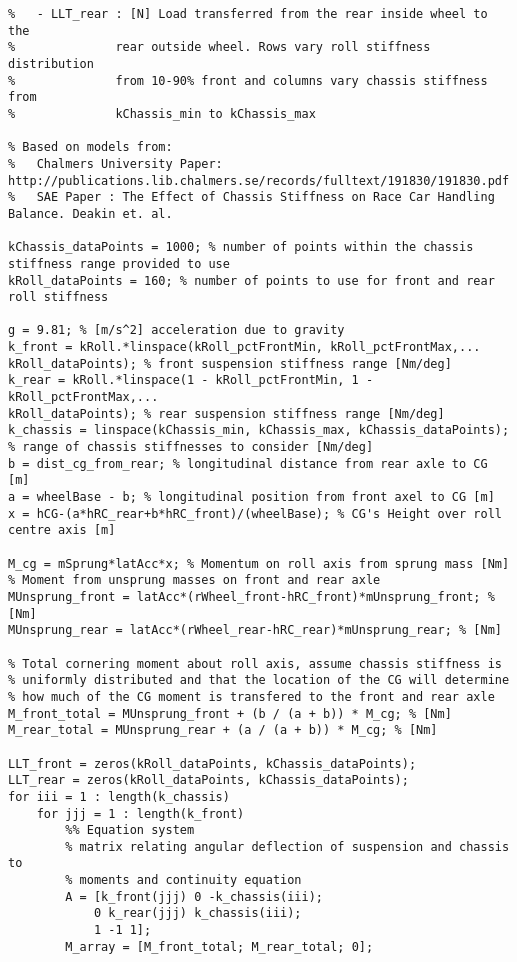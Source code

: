 \begin{lstlisting}
%   - LLT_rear : [N] Load transferred from the rear inside wheel to the 
%              rear outside wheel. Rows vary roll stiffness distribution 
%              from 10-90% front and columns vary chassis stiffness from 
%              kChassis_min to kChassis_max

% Based on models from:
%	Chalmers University Paper: http://publications.lib.chalmers.se/records/fulltext/191830/191830.pdf
%	SAE Paper : The Effect of Chassis Stiffness on Race Car Handling Balance. Deakin et. al.

kChassis_dataPoints = 1000; % number of points within the chassis stiffness range provided to use
kRoll_dataPoints = 160; % number of points to use for front and rear roll stiffness

g = 9.81; % [m/s^2] acceleration due to gravity
k_front = kRoll.*linspace(kRoll_pctFrontMin, kRoll_pctFrontMax,...
kRoll_dataPoints); % front suspension stiffness range [Nm/deg]
k_rear = kRoll.*linspace(1 - kRoll_pctFrontMin, 1 - kRoll_pctFrontMax,...
kRoll_dataPoints); % rear suspension stiffness range [Nm/deg]
k_chassis = linspace(kChassis_min, kChassis_max, kChassis_dataPoints); % range of chassis stiffnesses to consider [Nm/deg]
b = dist_cg_from_rear; % longitudinal distance from rear axle to CG [m]
a = wheelBase - b; % longitudinal position from front axel to CG [m]
x = hCG-(a*hRC_rear+b*hRC_front)/(wheelBase); % CG's Height over roll centre axis [m]

M_cg = mSprung*latAcc*x; % Momentum on roll axis from sprung mass [Nm]
% Moment from unsprung masses on front and rear axle
MUnsprung_front = latAcc*(rWheel_front-hRC_front)*mUnsprung_front; % [Nm]
MUnsprung_rear = latAcc*(rWheel_rear-hRC_rear)*mUnsprung_rear; % [Nm]

% Total cornering moment about roll axis, assume chassis stiffness is
% uniformly distributed and that the location of the CG will determine
% how much of the CG moment is transfered to the front and rear axle
M_front_total = MUnsprung_front + (b / (a + b)) * M_cg; % [Nm]
M_rear_total = MUnsprung_rear + (a / (a + b)) * M_cg; % [Nm]

LLT_front = zeros(kRoll_dataPoints, kChassis_dataPoints);
LLT_rear = zeros(kRoll_dataPoints, kChassis_dataPoints);
for iii = 1 : length(k_chassis)
	for jjj = 1 : length(k_front)
		%% Equation system
		% matrix relating angular deflection of suspension and chassis to 
		% moments and continuity equation
		A = [k_front(jjj) 0 -k_chassis(iii);
			0 k_rear(jjj) k_chassis(iii);
			1 -1 1];
		M_array = [M_front_total; M_rear_total; 0];


\end{lstlisting}
